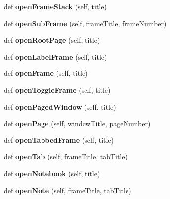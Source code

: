 \begin{DoxyCompactItemize}
def {\bfseries open\+Frame\+Stack} (self, title)
\item 
\mbox{\label{classappjar_1_1gui_a7bf0c9df7bffb71b0ccd222d6c647492}} 
def {\bfseries open\+Sub\+Frame} (self, frame\+Title, frame\+Number)
\item 
\mbox{\label{classappjar_1_1gui_a89b0544e0dff560e18a4de1e92056e29}} 
def {\bfseries open\+Root\+Page} (self, title)
\item 
\mbox{\label{classappjar_1_1gui_a590e3bdf56205a91dc72d05307b3e3a8}} 
def {\bfseries open\+Label\+Frame} (self, title)
\item 
\mbox{\label{classappjar_1_1gui_adfdff9220506e87436081c8ff0ff8a82}} 
def {\bfseries open\+Frame} (self, title)
\item 
\mbox{\label{classappjar_1_1gui_a8ab0a355392b70c458f1954bb1eb9a62}} 
def {\bfseries open\+Toggle\+Frame} (self, title)
\item 
\mbox{\label{classappjar_1_1gui_ade9b12ec0f4c9c02f5a86745e5e28d87}} 
def {\bfseries open\+Paged\+Window} (self, title)
\item 
\mbox{\label{classappjar_1_1gui_a5cf115adfe260f28649fdb2cd35b6c79}} 
def {\bfseries open\+Page} (self, window\+Title, page\+Number)
\item 
\mbox{\label{classappjar_1_1gui_ade58e06f77f3a88f1468d578603174b7}} 
def {\bfseries open\+Tabbed\+Frame} (self, title)
\item 
\mbox{\label{classappjar_1_1gui_aa47c2f2f82feb0aaa17a4fd5bcbd4f8f}} 
def {\bfseries open\+Tab} (self, frame\+Title, tab\+Title)
\item 
\mbox{\label{classappjar_1_1gui_aab4b2974e31ad85552e88edfd2b79fb4}} 
def {\bfseries open\+Notebook} (self, title)
\item 
\mbox{\label{classappjar_1_1gui_a51e875e6ee83de813a6677192ef62567}} 
def {\bfseries open\+Note} (self, frame\+Title, tab\+Title)

\end{DoxyCompactItemize}
